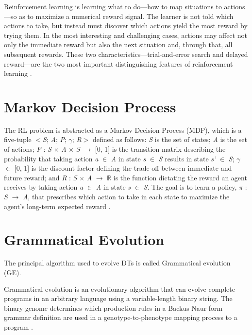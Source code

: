 Reinforcement learning is learning what to do—how to map situations to actions—so as to maximize a numerical reward signal. The learner is not told which actions to take, but instead must discover which actions yield the most reward by trying them. In the most interesting and challenging cases, actions may affect not only the immediate reward but also the next situation and, through that, all subsequent rewards. These two characteristics—trial-and-error search and delayed reward—are the two most important distinguishing features of reinforcement learning \cite{sutton}.


\section{Markov Decision Process}
\label{sec:120}
The RL problem is abstracted as a Markov Decision Process (MDP), which is a five-tuple \(<\)\textit{S}; \textit{A}; \textit{P}; \(\gamma\); \textit{R}\(>\) defined as follows: \textit{S} is the set of states; \textit{A} is the set of actions; \textit{P} : \textit{S} \(\times\) \textit{A} \(\times\) \textit{S} \(\rightarrow\) [0, 1] is the transition matrix describing the probability that taking action \textit{a} \(\in\) \textit{A} in state \textit{s} \(\in\) \textit{S} results in state \textit{s'} \(\in\) \textit{S}; \(\gamma\)  \(\in\) [0, 1] is the discount factor defining the trade-off between immediate and future reward; and \textit{R} : \textit{S} \(\times\) \textit{A} \(\rightarrow\) \(\mathbb{R}\) is the function dictating the reward an agent receives by taking action \textit{a} \(\in\) \textit{A} in state \textit{s} \(\in\) \textit{S}. The goal is to learn a policy, \(\pi\) : \textit{S} \(\rightarrow\) \textit{A}, that prescribes which action to take in each state to maximize the agent’s long-term expected reward \cite{silva}.


\section{Grammatical Evolution}
\label{sec:130}
The principal algorithm used to evolve DTs is called Grammatical evolution (GE).

Grammatical evolution is an evolutionary algorithm that can evolve complete programs in an arbitrary language using a variable-length binary string. The binary genome determines which production rules in a Backus-Naur form grammar definition are used in a genotype-to-phenotype mapping process to a program \cite{neill}.

